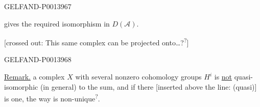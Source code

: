 \begin{GelfandAdjacentEvidence}{GELFAND-P001396}{7}

gives the required isomorphism in \(D(\mathcal A)\).

[crossed out:
This same complex can be projected onto…?\textsuperscript{?}]
\end{GelfandAdjacentEvidence}
\begin{GelfandAdjacentEvidence}{GELFAND-P001396}{8}


\uline{Remark.} a complex \(X\) with several nonzero  cohomology groups \(H^i\) is
\uline{not} quasi-isomorphic (in general) to the sum, and if there
[inserted above the line: (quasi)] is one, the way is non-unique\textsuperscript{?}.
\end{GelfandAdjacentEvidence}




